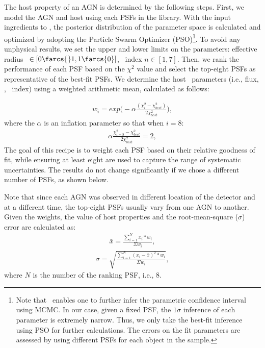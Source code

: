 \documentclass[apj]{emulateapj}
\begin{document}
The host property of an AGN is determined by the following steps. First, we model the AGN and host using each PSFs in the library. With the input ingredients to \lenstronomy, the posterior distribution of the parameter space is calculated and optimized by adopting the Particle Swarm Optimizer (PSO)\footnote{Note that \lenstronomy\ enables one to further infer the parametric confidence interval using MCMC. In our case, given a fixed PSF, the $1\sigma$ inference of each parameter is extremely narrow. Thus, we only take the best-fit inference using PSO for further calculations. The errors on the fit parameters are assessed by using different PSFs for each object in the sample.}.
To avoid any unphysical results, we set the upper and lower limits on the parameters: effective radius \Reff\ $\in[0\farcs{}1,1\farcs{0}]$, \sersic\ index $n\in[1,7]$.
Then, we rank the performance of each PSF based on the $\chi^2$ value and select the top-eight PSFs as representative of the best-fit PSFs. We determine the host \sersic\ parameters (i.e., flux, \Reff, \sersic\ index) using a weighted arithmetic mean, calculated as follows:

\begin{eqnarray}
\label{eq:weights}
w_i = exp \big(- \alpha \frac{ (\chi_i ^2 - \chi_{best} ^2 )}{2 \chi_{best} ^2} \big),
\end{eqnarray} 
where the $\alpha$ is an inflation parameter so that when $i=8$:
\begin{eqnarray}
\label{eq:alpha}
\alpha \frac{ \chi_{i=8} ^2 - \chi_{best} ^2 }{2 \chi_{best} ^2} = 2,
\end{eqnarray} 
The goal of this recipe is to weight each PSF based on their relative goodness of fit, while ensuring at least eight are used to capture the range of systematic uncertainties. The results do not change significantly if we chose a different number of PSFs, as shown below.

Note that since each AGN was observed in different location of the detector and at a different time, the top-eight PSFs usually vary from one AGN to another. Given the weights, the value of host properties and the root-mean-square ($\sigma$) error are calculated as:
\begin{eqnarray}
\label{eq:infer_value}
\bar{x}  =  \frac{  \sum_{i=1}^{N}   x_i * w_i  }{\Sigma w_i} ,
\end{eqnarray} 
\begin{eqnarray}
\sigma =   \sqrt{ \frac{  \sum_{i=1}^{N}   (x_i -  \bar{x} ) ^2 * w_i  }{\Sigma w_i} },
\end{eqnarray} 
where $N$ is the number of the ranking PSF, i.e., 8.
\end{document}
